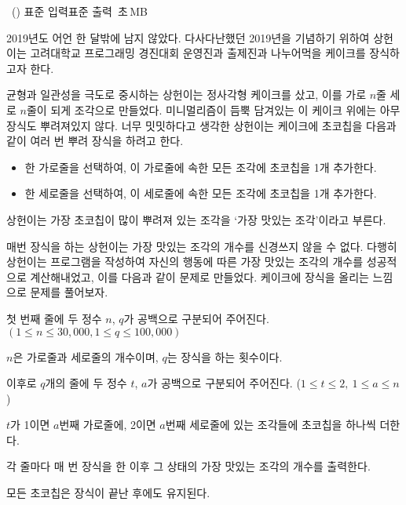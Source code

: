 \begin{problem}{\kcpcprobcake\ (\kcpcprobcakeshort)}
    {표준 입력}{표준 출력}
    {\kcpcprobcaketime\,초}{\kcpcprobcakememory\,MB}{}
    
    2019년도 어언 한 달밖에 남지 않았다. 다사다난했던 2019년을 기념하기 위하여 상헌이는 고려대학교 프로그래밍 경진대회 운영진과 출제진과 나누어먹을 케이크를 장식하고자 한다.
    
    균형과 일관성을 극도로 중시하는 상헌이는 정사각형 케이크를 샀고, 이를 가로 $n$줄 세로 $n$줄이 되게 조각으로 만들었다. 미니멀리즘이 듬뿍 담겨있는 이 케이크 위에는 아무 장식도 뿌려져있지 않다. 너무 밋밋하다고 생각한 상헌이는 케이크에 초코칩을 다음과 같이 여러 번 뿌려 장식을 하려고 한다.
    
    \begin{itemize}
        \item 한 가로줄을 선택하여, 이 가로줄에 속한 모든 조각에 초코칩을 1개 추가한다.
        \item 한 세로줄을 선택하여, 이 세로줄에 속한 모든 조각에 초코칩을 1개 추가한다.
    \end{itemize}
    
    상헌이는 가장 초코칩이 많이 뿌려져 있는 조각을 `가장 맛있는 조각'이라고 부른다.
    
    매번 장식을 하는 상헌이는 가장 맛있는 조각의 개수를 신경쓰지 않을 수 없다. 다행히 상헌이는 프로그램을 작성하여 자신의 행동에 따른 가장 맛있는 조각의 개수를 성공적으로 계산해내었고, 이를 다음과 같이 문제로 만들었다. 케이크에 장식을 올리는 느낌으로 문제를 풀어보자.

    
    \InputFile
    첫 번째 줄에 두 정수 $n$, $q$가 공백으로 구분되어 주어진다. $(1 \leq n \leq 30,000, 1 \leq q \leq 100,000)$
    
    $n$은 가로줄과 세로줄의 개수이며, $q$는 장식을 하는 횟수이다. 
    
    이후로 $q$개의 줄에 두 정수 $t$, $a$가 공백으로 구분되어 주어진다. ($1 \leq t \leq 2,\ 1 \leq a \leq n$)
    
    $t$가 1이면 $a$번째 가로줄에, 2이면 $a$번째 세로줄에 있는 조각들에 초코칩을 하나씩 더한다.
    
    \OutputFile
    각 줄마다 매 번 장식을 한 이후 그 상태의 가장 맛있는 조각의 개수를 출력한다.
    
    모든 초코칩은 장식이 끝난 후에도 유지된다.
    
    \Examples
    \begin{example}
    \end{example}
    

\end{problem}
